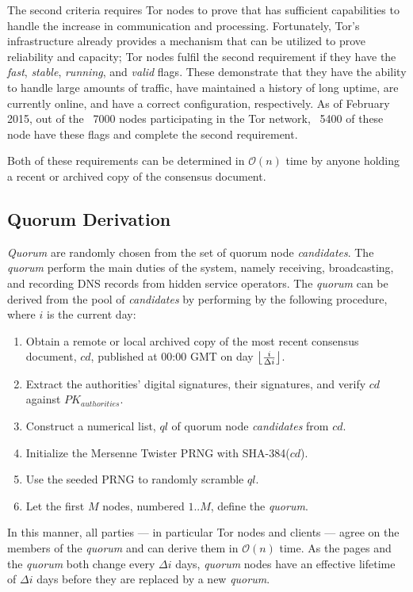 The second criteria requires Tor nodes to prove that has sufficient capabilities to handle the increase in communication and processing. Fortunately, Tor's infrastructure already provides a mechanism that can be utilized to prove reliability and capacity; Tor nodes fulfil the second requirement if they have the \emph{fast}, \emph{stable}, \emph{running}, and \emph{valid} flags. These demonstrate that they have the ability to handle large amounts of traffic, have maintained a history of long uptime, are currently online, and have a correct configuration, respectively. As of February 2015, out of the ~7000 nodes participating in the Tor network, ~5400 of these node have these flags and complete the second requirement.

Both of these requirements can be determined in $ \mathcal{O}(n) $ time by anyone holding a recent or archived copy of the consensus document.

\subsection{Quorum Derivation}

\emph{Quorum} are randomly chosen from the set of quorum node \emph{candidates}. The \emph{quorum} perform the main duties of the system, namely receiving, broadcasting, and recording DNS records from hidden service operators. The \emph{quorum} can be derived from the pool of \emph{candidates} by performing by the following procedure, where $ i $ is the current day:

\begin{enumerate}
	\item Obtain a remote or local archived copy of the most recent consensus document, $ cd $, published at 00:00 GMT on day $ \floor[\big]{\frac{i}{\Delta i}} $.
	\item Extract the authorities' digital signatures, their signatures, and verify $ cd $ against $ PK_{authorities} $.
	\item Construct a numerical list, $ ql $ of quorum node \emph{candidates} from $ cd $.
	\item Initialize the Mersenne Twister PRNG with SHA-384($ cd $).
	\item Use the seeded PRNG to randomly scramble $ ql $.
	\item Let the first $ M $ nodes, numbered $ 1 .. M $, define the \emph{quorum}.
\end{enumerate}

In this manner, all parties --- in particular Tor nodes and clients --- agree on the members of the \emph{quorum} and can derive them in $ \mathcal{O}(n) $ time. As the pages and the \emph{quorum} both change every $ \Delta i $ days, \emph{quorum} nodes have an effective lifetime of $ \Delta i $ days before they are replaced by a new \emph{quorum}.

